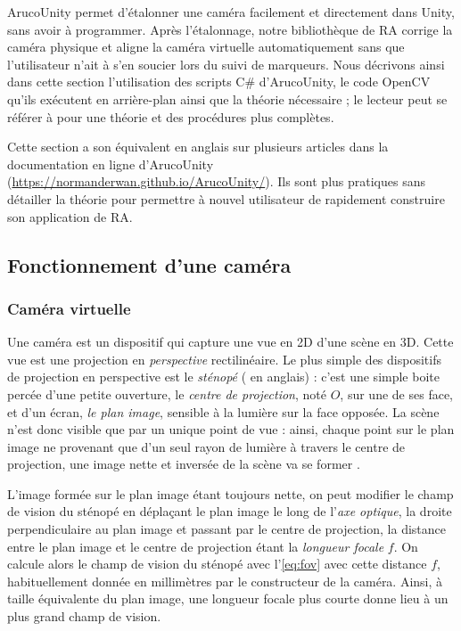 ArucoUnity permet d'étalonner une caméra facilement et directement dans Unity, sans avoir à programmer. Après l'étalonnage, notre bibliothèque de RA corrige la caméra physique et aligne la caméra virtuelle automatiquement sans que l'utilisateur n'ait à s'en soucier lors du suivi de marqueurs. Nous décrivons ainsi dans cette section l'utilisation des scripts C\# d'ArucoUnity, le code OpenCV qu'ils exécutent en arrière-plan ainsi que la théorie nécessaire ; le lecteur peut se référer à \cite[chap. 18-19]{Kaehler2017} pour une théorie et des procédures plus complètes.

Cette section a son équivalent en anglais sur plusieurs articles dans la documentation en ligne d'ArucoUnity (\url{https://normanderwan.github.io/ArucoUnity/}). Ils sont plus pratiques sans détailler la théorie pour permettre à nouvel utilisateur de rapidement construire son application de RA.

\subsection{Fonctionnement d'une caméra}
\label{subsec:camera_theory}

\subsubsection{Caméra virtuelle}
Une caméra est un dispositif qui capture une vue en 2D d'une scène en 3D. Cette vue est une projection en \emph{perspective} rectilinéaire. Le plus simple des dispositifs de projection en perspective est le \emph{sténopé} ( en anglais) : c'est une simple boite percée d'une petite ouverture, le \emph{centre de projection}, noté $O$, sur une de ses face, et d'un écran, \emph{le plan image}, sensible à la lumière sur la face opposée. La scène n'est donc visible que par un unique point de vue : ainsi, chaque point sur le plan image ne provenant que d'un seul rayon de lumière à travers le centre de projection, une image nette et inversée de la scène va se former .


L'image formée sur le plan image étant toujours nette, on peut modifier le champ de vision du sténopé en déplaçant le plan image le long de l'\emph{axe optique}, la droite perpendiculaire au plan image et passant par le centre de projection, la distance entre le plan image et le centre de projection étant la \emph{longueur focale} $f$. On calcule alors le champ de vision du sténopé avec l'\autoref{eq:fov} avec cette distance $f$, habituellement donnée en millimètres par le constructeur de la caméra. Ainsi, à taille équivalente du plan image, une longueur focale plus courte donne lieu à un plus grand champ de vision.

